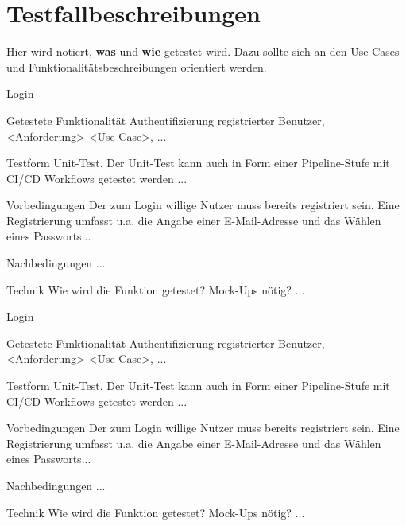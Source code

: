 \chapter{Testfallbeschreibungen}
\label{chap:test}

Hier wird notiert, \textbf{was} und \textbf{wie} getestet wird. Dazu sollte sich an den Use-Cases und Funktionalitätsbeschreibungen orientiert werden.

\begin{testcase}{10}{Login}
  \item[Getestete Funktionalität] Authentifizierung registrierter Benutzer, <Anforderung> <Use-Case>, ...
  \item[Testform] Unit-Test. Der Unit-Test kann auch in Form einer Pipeline-Stufe mit CI/CD Workflows getestet werden ...
  \item[Vorbedingungen] Der zum Login willige Nutzer muss bereits registriert sein. Eine Registrierung umfasst u.a. die Angabe einer E-Mail-Adresse und das Wählen eines Passworts...
  \item[Nachbedingungen] ...
  \item[Technik] Wie wird die Funktion getestet? Mock-Ups nötig? ...
\end{testcase}

\begin{testcase}{10}{Login}
  \item[Getestete Funktionalität] Authentifizierung registrierter Benutzer, <Anforderung> <Use-Case>, ...
  \item[Testform] Unit-Test. Der Unit-Test kann auch in Form einer Pipeline-Stufe mit CI/CD Workflows getestet werden ...
  \item[Vorbedingungen] Der zum Login willige Nutzer muss bereits registriert sein. Eine Registrierung umfasst u.a. die Angabe einer E-Mail-Adresse und das Wählen eines Passworts...
  \item[Nachbedingungen] ...
  \item[Technik] Wie wird die Funktion getestet? Mock-Ups nötig? ...
\end{testcase}
